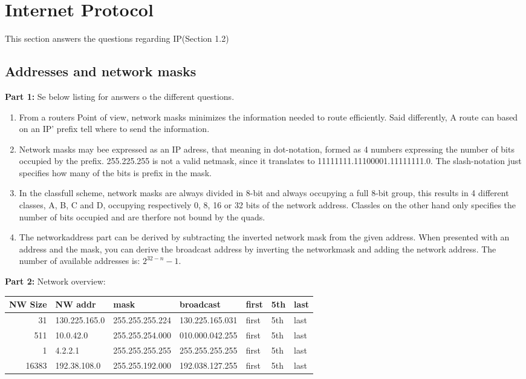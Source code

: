 \section{Internet Protocol}
This section answers the questions regarding IP(Section 1.2)

\subsection{Addresses and network masks}
\textbf{Part 1: } Se below listing for answers o the different questions.

\begin{enumerate}
\item From a routers Point of view, network masks minimizes the information
    needed to route efficiently. Said differently, A route can based on an IP'
    prefix tell where to send the information.
\item Network masks may bee expressed as an IP adress, that meaning in
    dot-notation, formed as 4 numbers expressing the number of bits occupied by the
    prefix. 255.225.255 is not a valid netmask, since it translates to
    11111111.11100001.11111111.0. The slash-notation just specifies how many of the
    bits is prefix in the mask.
\item In the classfull scheme, network masks are always divided in 8-bit and
    always occupying a full 8-bit group, this results in 4 different classes, A, B,
    C and D, occupying respectively 0, 8, 16 or 32 bits of the network address.
    Classles on the other hand only specifies the number of bits occupied and are
    therfore not bound by the quads.
\item The networkaddress part can be derived by subtracting the inverted
    network mask from the given address. When presented with an address and the 
    mask, you can derive the broadcast address by inverting the networkmask and 
    adding the network address. The number of available addresses is: 
    $2^{32 - n}-1$.
\end{enumerate}

\textbf{Part 2: } Network overview:

\begin{tabular}{| r | l | l | l | l | l | l |}
\hline
NW Size & NW addr       & mask            & broadcast       & first & 5th & last \\ \hline
31      & 130.225.165.0 & 255.255.255.224 & 130.225.165.031 & first & 5th & last \\ \hline
511     & 10.0.42.0     & 255.255.254.000 & 010.000.042.255 & first & 5th & last \\ \hline
1       & 4.2.2.1       & 255.255.255.255 & 255.255.255.255 & first & 5th & last \\ \hline
16383   & 192.38.108.0  & 255.255.192.000 & 192.038.127.255 & first & 5th & last \\ \hline
\end{tabular}

